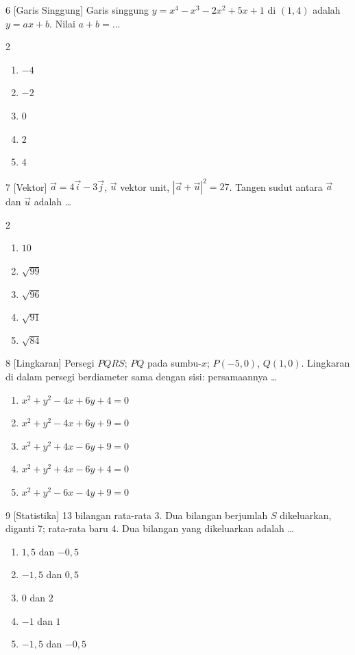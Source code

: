 \documentclass[11pt]{article}
\newenvironment{pil}{%
  \begin{enumerate}[label=(\alph*),leftmargin=*,itemsep=1pt,topsep=3pt]}%
  {\end{enumerate}}
\newenvironment{pilB}{%
  \par\smallskip\begin{multicols}{2}
  \begin{enumerate}[label=(\alph*),leftmargin=*,itemsep=1pt,topsep=3pt]}%
  {\end{enumerate}\end{multicols}}
\begin{document}
\begin{soal}{6 \normalfont\small[Garis Singgung]}
Garis singgung $y=x^4-x^3-2x^2+5x+1$ di $(1,4)$ adalah $y=ax+b$.
Nilai $a+b=\ldots$
\begin{pilB}
  \item $-4$ \item $-2$ \item $0$ \item $2$ \item $4$
\end{pilB}
\end{soal}

\begin{soal}{7 \normalfont\small[Vektor]}
$\vec a=4\vec i-3\vec j$, $\vec u$ vektor unit, $|\vec a+\vec u|^2=27$.
Tangen sudut antara $\vec a$ dan $\vec u$ adalah \ldots
\begin{pilB}
  \item $10$ \item $\sqrt{99}$ \item $\sqrt{96}$ \item $\sqrt{91}$ \item $\sqrt{84}$
\end{pilB}
\end{soal}

\begin{soal}{8 \normalfont\small[Lingkaran]}
Persegi $PQRS$; $PQ$ pada sumbu-$x$; $P(-5,0)$, $Q(1,0)$. Lingkaran di dalam persegi berdiameter sama dengan sisi: persamaannya \ldots
\begin{pil}
  \item $x^2+y^2-4x+6y+4=0$ \item $x^2+y^2-4x+6y+9=0$
  \item $x^2+y^2+4x-6y+9=0$ \item $x^2+y^2+4x-6y+4=0$
  \item $x^2+y^2-6x-4y+9=0$
\end{pil}
\end{soal}

\begin{soal}{9 \normalfont\small[Statistika]}
13 bilangan rata-rata 3. Dua bilangan berjumlah $S$ dikeluarkan, diganti 7; rata-rata baru 4.
Dua bilangan yang dikeluarkan adalah \ldots
\begin{pil}
  \item $1{,}5$ dan $-0{,}5$ \item $-1{,}5$ dan $0{,}5$
  \item $0$ dan $2$ \item $-1$ dan $1$ \item $-1{,}5$ dan $-0{,}5$
\end{pil}
\end{soal}
\end{document}
